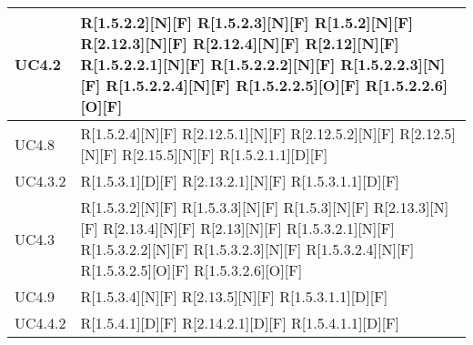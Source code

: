 \begin{longtable}{X | X}
\hline
UC4.2 & R[1.5.2.2][N][F] \newline
R[1.5.2.3][N][F] \newline
R[1.5.2][N][F] \newline
R[2.12.3][N][F] \newline
R[2.12.4][N][F] \newline
R[2.12][N][F] \newline
R[1.5.2.2.1][N][F] \newline
R[1.5.2.2.2][N][F] \newline
R[1.5.2.2.3][N][F] \newline
R[1.5.2.2.4][N][F] \newline
R[1.5.2.2.5][O][F] \newline
R[1.5.2.2.6][O][F]  \\
\hline
UC4.8 & R[1.5.2.4][N][F] \newline
R[2.12.5.1][N][F] \newline
R[2.12.5.2][N][F] \newline
R[2.12.5][N][F] \newline
R[2.15.5][N][F] \newline
R[1.5.2.1.1][D][F]  \\
\hline
UC4.3.2 & R[1.5.3.1][D][F] \newline
R[2.13.2.1][N][F] \newline
R[1.5.3.1.1][D][F]  \\
\hline
UC4.3 & R[1.5.3.2][N][F] \newline
R[1.5.3.3][N][F] \newline
R[1.5.3][N][F] \newline
R[2.13.3][N][F] \newline
R[2.13.4][N][F] \newline
R[2.13][N][F] \newline
R[1.5.3.2.1][N][F] \newline
R[1.5.3.2.2][N][F] \newline
R[1.5.3.2.3][N][F] \newline
R[1.5.3.2.4][N][F] \newline
R[1.5.3.2.5][O][F] \newline
R[1.5.3.2.6][O][F]  \\
\hline
UC4.9 & R[1.5.3.4][N][F] \newline
R[2.13.5][N][F] \newline
R[1.5.3.1.1][D][F]  \\
\hline
UC4.4.2 & R[1.5.4.1][D][F] \newline
R[2.14.2.1][D][F] \newline
R[1.5.4.1.1][D][F]  \\

\end{longtable}
